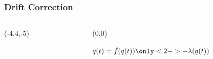 \begin{frame}
	\frametitle{Drift Correction}
		\begin{columns}[T] %
			\begin{column}{.55\textwidth}
			\centering
				\begin{textblock}{0}(-4.4,-5)
					
				\end{textblock}
			\end{column}
			\hfill
			\begin{column}{0.45\textwidth}
				\begin{textblock}{.963\columnwidth}(0,0)
					\begin{block}{}
					\centering
						\( \dot{q}(t) = \tilde{f}(q(t))\only<2->{-\lambda(q(t))} \)
					\end{block}
				\end{textblock}
				\end{column}
		\end{columns}
\end{frame}


